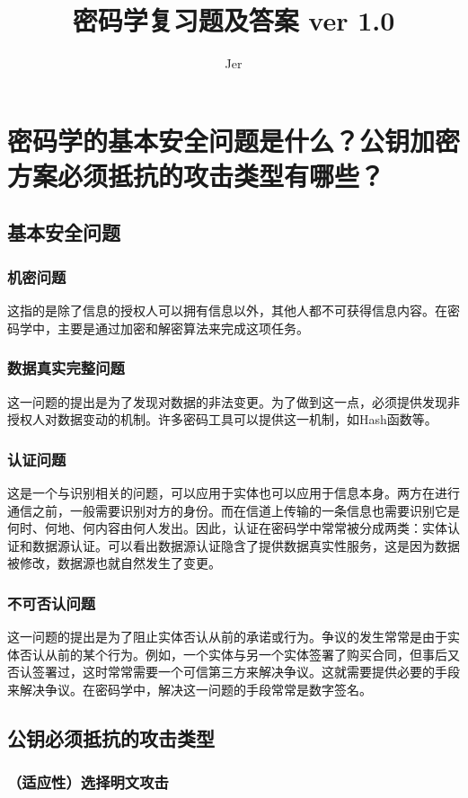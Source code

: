 \documentclass[11pt,a4paper]{article}
\title{密码学复习题及答案 ver 1.0}
\author{Jer}
\begin{document}
\maketitle

\section{密码学的基本安全问题是什么？公钥加密方案必须抵抗的攻击类型有哪些？}
\subsection{基本安全问题}
\subsubsection{机密问题}这指的是除了信息的授权人可以拥有信息以外，其他人都不可获得信息内容。在密码学中，主要是通过加密和解密算法来完成这项任务。
\subsubsection{数据真实完整问题}这一问题的提出是为了发现对数据的非法变更。为了做到这一点，必须提供发现非授权人对数据变动的机制。许多密码工具可以提供这一机制，如Hash函数等。
\subsubsection{认证问题}这是一个与识别相关的问题，可以应用于实体也可以应用于信息本身。两方在进行通信之前，一般需要识别对方的身份。而在信道上传输的一条信息也需要识别它是何时、何地、何内容由何人发出。因此，认证在密码学中常常被分成两类：实体认证和数据源认证。可以看出数据源认证隐含了提供数据真实性服务，这是因为数据被修改，数据源也就自然发生了变更。
\subsubsection{不可否认问题}这一问题的提出是为了阻止实体否认从前的承诺或行为。争议的发生常常是由于实体否认从前的某个行为。例如，一个实体与另一个实体签署了购买合同，但事后又否认签署过，这时常常需要一个可信第三方来解决争议。这就需要提供必要的手段来解决争议。在密码学中，解决这一问题的手段常常是数字签名。

\subsection{公钥必须抵抗的攻击类型}
\subsubsection{（适应性）选择明文攻击}
\end{document}
